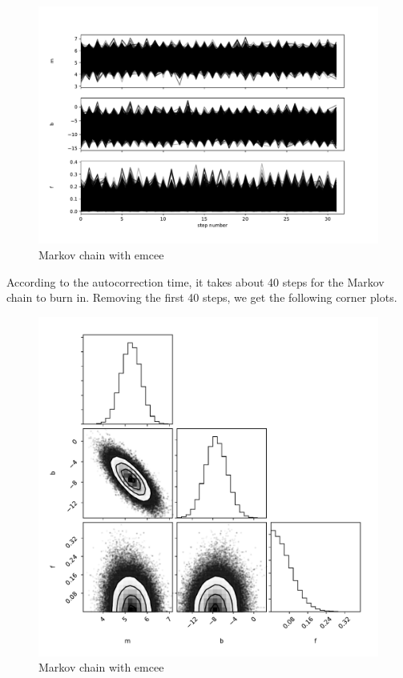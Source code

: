 \documentclass{article}
\begin{document}
\begin{figure}[H]
  \centering
\includegraphics[scale=0.3]{Markov Chain}
\caption{Markov chain with emcee}
\end{figure}

According to the autocorrection time, it takes about 40 steps for the Markov chain to burn in.
Removing the first 40 steps, we get the following corner plots.

\begin{figure}[H]
  \centering
\includegraphics[scale=0.3]{Corner Graphs}
\caption{Markov chain with emcee}
\end{figure}
\end{document}
